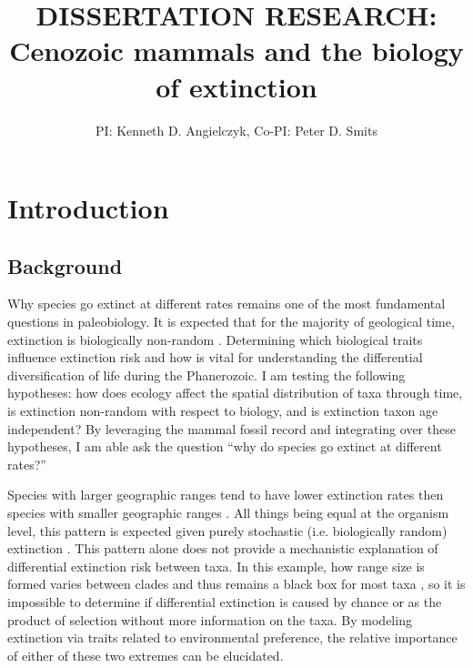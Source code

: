 \documentclass[11pt,letterpaper]{article}
\title{\uppercase{Dissertation Research:}\\ Cenozoic mammals and the biology of extinction}
\author{PI: Kenneth D. Angielczyk, Co-PI: Peter D. Smits}
\date{}
\begin{document}
\linenumbers
\modulolinenumbers[2]

\setcounter{secnumdepth}{0}

\maketitle


\section{Introduction}
\subsection{Background}
Why species go extinct at different rates remains one of the most fundamental questions in paleobiology. It is expected that for the majority of geological time, extinction is biologically non-random \citep{Jablonski1986,Alexander1977,Harnik2011,Johnson2002b,Kitchell1986,Nurnberg2013a,Payne2007}. Determining which biological traits influence extinction risk and how is vital for understanding the differential diversification of life during the Phanerozoic. I am testing the following hypotheses: how does ecology affect the spatial distribution of taxa through time, is extinction non-random with respect to biology, and is extinction taxon age independent? By leveraging the mammal fossil record and integrating over these hypotheses, I am able ask the question ``why do species go extinct at different rates?''

Species with larger geographic ranges tend to have lower extinction rates then species with smaller geographic ranges \citep{Jablonski1986,Harnik2013,Nurnberg2013a,Jablonski2003,Roy2009c}. All things being equal at the organism level, this pattern is expected given purely stochastic (i.e. biologically random) extinction \citep{Raup1991b}. This pattern alone does not provide a mechanistic explanation of differential extinction risk between taxa. In this example, how range size is formed varies between clades and thus remains a black box for most taxa \citep{Jablonski1987}, so it is impossible to determine if differential extinction is caused by chance or as the product of selection without more information on the taxa. By modeling extinction via traits related to environmental preference, the relative importance of either of these two extremes can be elucidated.
\end{document}
